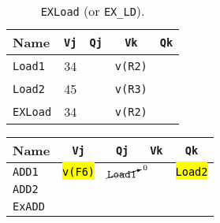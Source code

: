 \begin{enumerate}
    \begin{table}[!htp]
        \centering
        \begin{tabular}{@{} l | c c c c @{}}
            \toprule
            Name            & \texttt{Vj}   & \texttt{Qj}   & \texttt{Vk}           & \texttt{Qk}   \\
            \midrule
            \texttt{Load1}  & 34            &               & \texttt{v(R2)}        &               \\ [.3em]
            \texttt{Load2}  & 45            &               & \texttt{v(R3)}        &               \\
            \cmidrule{1-5}
            \texttt{EXLoad} & 34            &               & \texttt{v(R2)}        &               \\
            \bottomrule
        \end{tabular}
        \caption*{\texttt{EXLoad} (or \texttt{EX\_LD}).}
    \end{table}

    \begin{table}[!htp]
        \centering
        \begin{tabular}{@{} l | c c c c @{}}
            \toprule
            Name            & \texttt{Vj}           & \texttt{Qj}                       & \texttt{Vk}           & \texttt{Qk}           \\
            \midrule
            \texttt{ADD1}   & \hl{\texttt{v(F6)}}   & $\cancelto{0}{\texttt{Load1}}$    &                       & \hl{\texttt{Load2}}   \\ [.3em]
            \texttt{ADD2}   &                       &                                   &                       &                       \\
            \cmidrule{1-5}
            \texttt{ExADD}  &                       &                                   &                       &                       \\
            \bottomrule
        \end{tabular}
    \end{table}
    
    \newpage


\end{enumerate}
